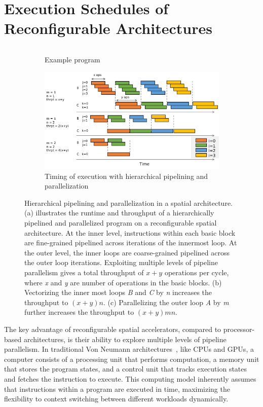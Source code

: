 \section{Execution Schedules of Reconfigurable Architectures} 
\begin{figure}
\begin{subfigure}[b]{0.34\textwidth}
\inputminted{python}{code/spatialeg2.py}
\caption {
  Example program
}
\end{subfigure}
\hfill
\begin{subfigure}[b]{0.65\textwidth}
\centering
\includegraphics[width=1.0\textwidth]{figs/pipeexec.pdf}
\caption {
  Timing of execution with hierarchical pipelining and parallelization
}
\end{subfigure}
\caption[Hiearchical pipelining and parallelization on spatial architecture]{
Hierarchical pipelining and parallelization in a spatial architecture.
(a) illustrates the runtime and throughput of a hierarchically pipelined and parallelized program on
a reconfigurable spatial architecture. 
At the inner level, instructions within each basic
block are fine-grained pipelined across iterations of the innermost loop. 
At the outer level, the inner loops are coarse-grained pipelined across the outer loop iterations.
Exploiting multiple levels of pipeline parallelism gives a total throughput of $x+y$ operations per
  cycle, where \emph{x} and \emph{y} are number of operations in the basic blocks.
  (b) Vectorizing the inner most loops \emph{B} and \emph{C} by \emph{n} increases the throughput to $(x+y)n$.
  (c) Parallelizing the outer loop \emph{A} by \emph{m} further increases the throughput to $(x+y)mn$.
}
\label{fig:pipeexec}
\end{figure}

The key advantage of reconfigurable spatial accelerators, compared to processor-based architectures, 
is their ability to explore multiple levels of pipeline parallelism. 
In traditional Von Neumann architectures~\cite{vonneumann}, like CPUs and GPUs,
a computer consists of a processing unit that performs
computation, a memory unit that stores the program states, and a control unit that tracks execution states and fetches the instruction to execute. 
This computing model inherently assumes that
instructions within a program are executed in time, maximizing the flexibility to context switching between different workloads dynamically.

